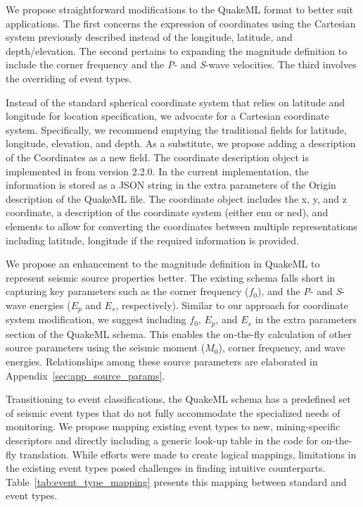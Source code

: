 We propose straightforward modifications to the QuakeML format to better suit \museismic applications. The first concerns the expression of coordinates using the Cartesian system previously described instead of the longitude, latitude, and depth/elevation. The second pertains to expanding the magnitude definition to include the corner frequency and the \textit{P}- and \textit{S}-wave velocities. The third involves the overriding of event types.

Instead of the standard spherical coordinate system that relies on latitude and longitude for location specification, we advocate for a Cartesian coordinate system. Specifically, we recommend emptying the traditional fields for latitude, longitude, elevation, and depth. As a substitute, we propose adding a description of the Coordinates as a new field. The coordinate description object is implemented in \muquake from version 2.2.0. In the current implementation, the information is stored as a JSON string in the extra parameters of the Origin description of the  QuakeML file. The coordinate object includes the x, y, and z coordinate, a description of the coordinate system (either \gls{enu} or \gls{ned}), and elements to allow for converting the coordinates between multiple representations including latitude, longitude if the required information is provided.

We propose an enhancement to the magnitude definition in QuakeML to represent seismic source properties better. The existing schema falls short in capturing key parameters such as the corner frequency ($f_0$), and the \textit{P}- and \textit{S}-wave energies ($E_p$ and $E_s$, respectively). Similar to our approach for coordinate system modification, we suggest including $f_0$, $E_p$, and $E_s$ in the extra parameters section of the QuakeML schema. This enables the on-the-fly calculation of other source parameters using the seismic moment ($M_0$), corner frequency, and wave energies. Relationships among these source parameters are elaborated in Appendix~\ref{sec:app_source_params}.

Transitioning to event classifications, the QuakeML schema has a predefined set of seismic event types that do not fully accommodate the specialized needs of \museismic monitoring. We propose mapping existing event types to new, mining-specific descriptors and directly including a generic look-up table in the code for on-the-fly translation. While efforts were made to create logical mappings, limitations in the existing event types posed challenges in finding intuitive counterparts. Table~\ref{tab:event_type_mapping} presents this mapping between standard and \museismic event types.

